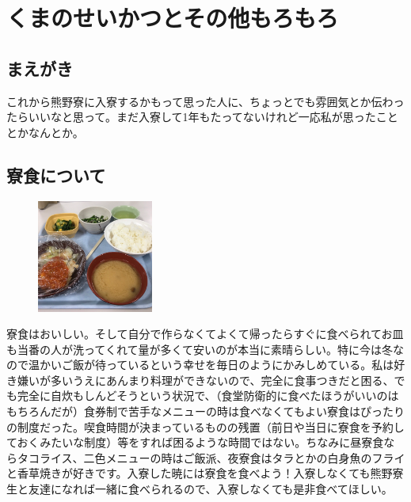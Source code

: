 \section{くまのせいかつとその他もろもろ}\label{sec:kumanoseikatu}


\subsection{まえがき}
これから熊野寮に入寮するかもって思った人に、ちょっとでも雰囲気とか伝わったらいいなと思って。まだ入寮して1年もたってないけれど一応私が思ったこととかなんとか。

\subsection{寮食について}
\begin{figure}
  \centering
  \includegraphics[width=3.8cm]{gazo/hanbagu.pdf}
\end{figure}



寮食はおいしい。そして自分で作らなくてよくて帰ったらすぐに食べられてお皿も当番の人が洗ってくれて量が多くて安いのが本当に素晴らしい。特に今は冬なので温かいご飯が待っているという幸せを毎日のようにかみしめている。私は好き嫌いが多いうえにあんまり料理ができないので、完全に食事つきだと困る、でも完全に自炊もしんどそうという状況で、（食堂防衛的に食べたほうがいいのはもちろんだが）食券制で苦手なメニューの時は食べなくてもよい寮食はぴったりの制度だった。喫食時間が決まっているものの残置（前日や当日に寮食を予約しておくみたいな制度）等をすれば困るような時間ではない。ちなみに昼寮食ならタコライス、二色メニューの時はご飯派、夜寮食はタラとかの白身魚のフライと香草焼きが好きです。入寮した暁には寮食を食べよう！入寮しなくても熊野寮生と友達になれば一緒に食べられるので、入寮しなくても是非食べてほしい。



